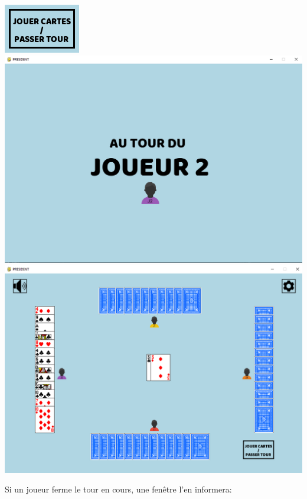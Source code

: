 \documentclass[french,12pt]{article}
\begin{document}
\begin{center}
	\includegraphics[scale=0.8]{img/jouer_cartes.png}\\
	\includegraphics[scale=0.3]{img/joueur2.png}\\
	\includegraphics[scale=0.3]{img/cartes_posees.png}
\end{center}

Si un joueur ferme le tour en cours, une fenêtre l'en informera:
\end{document}

